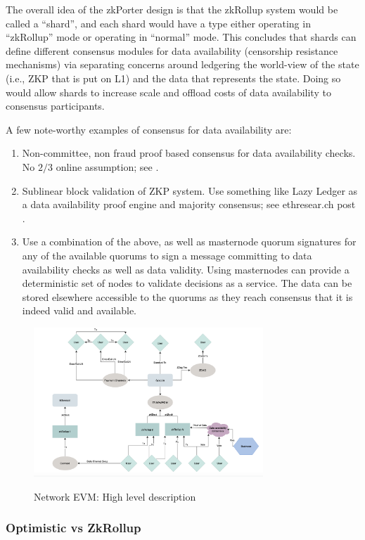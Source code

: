 \documentclass[peerreview]{ieeesyscoin}
\begin{document}
The overall idea of the zkPorter design is that the zkRollup system would be called a “shard”, and each shard would have a type either operating in “zkRollup” mode or operating in “normal” mode. This concludes that shards can define different consensus modules for data availability (censorship resistance mechanisms) via separating concerns around ledgering the world-view of the state (i.e., ZKP that is put on L1) and the data that represents the state. Doing so would allow shards to increase scale and offload costs of data availability to consensus participants.

A few note-worthy examples of consensus for data availability are:

\begin{enumerate}
\item Non-committee, non fraud proof based consensus for data availability checks. No $2/3$ online assumption; see \cite{But20}. 
\item Sublinear block validation of ZKP system. Use something like Lazy Ledger as a data availability proof engine and majority consensus; see ethresear.ch post \cite{Al20}. 
\item Use a combination of the above, as well as masternode quorum signatures for any of the available quorums to sign a message committing to data availability checks as well as data validity. Using masternodes can provide a deterministic set of nodes to validate decisions as a service. The data can be stored elsewhere accessible to the quorums as they reach consensus that it is indeed valid and available.
\end{enumerate}


\begin{figure}[h!]
\includegraphics[width=3.4in]{img/nevm.png}
\label{fig:nevm}
\caption{Network EVM: High level description} 
\end{figure} 

\subsubsection{Optimistic vs ZkRollup}
\end{document}
